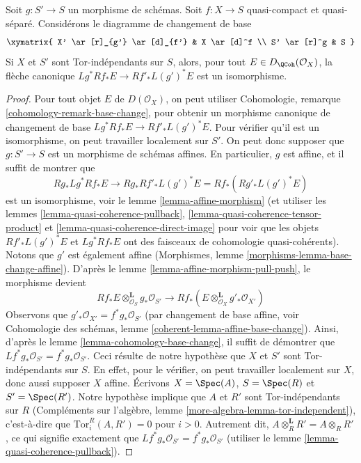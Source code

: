 \begin{lemma}
\label{lemma-compare-base-change}
Soit $g : S' \to S$ un morphisme de schémas.
Soit $f : X \to S$ quasi-compact et quasi-séparé.
Considérons le diagramme de changement de base
$$
\xymatrix{
X' \ar[r]_{g'} \ar[d]_{f'} &
X \ar[d]^f \\
S' \ar[r]^g &
S
}
$$
Si $X$ et $S'$ sont Tor-indépendants sur $S$, alors, pour tout
$E \in D_\QCoh(\mathcal{O}_X)$, la flèche canonique
$Lg^*Rf_*E \to Rf'_*L(g')^*E$ est un isomorphisme.
\end{lemma}

\begin{proof}
Pour tout objet $E$ de $D(\mathcal{O}_X)$, on peut utiliser
Cohomologie, remarque \ref{cohomology-remark-base-change}, pour obtenir un morphisme
canonique de changement de base $Lg^*Rf_*E \to Rf'_*L(g')^*E$. Pour vérifier qu'il
est un isomorphisme, on peut travailler localement sur $S'$. On peut donc supposer que
$g : S' \to S$ est un morphisme de schémas affines. En particulier, $g$
est affine, et il suffit de montrer que
$$
Rg_*Lg^*Rf_*E \to Rg_*Rf'_*L(g')^*E = Rf_*(Rg'_* L(g')^* E)
$$
est un isomorphisme, voir le lemme \ref{lemma-affine-morphism}
(et utiliser les lemmes \ref{lemma-quasi-coherence-pullback},
\ref{lemma-quasi-coherence-tensor-product} et
\ref{lemma-quasi-coherence-direct-image}
pour voir que les objets $Rf'_*L(g')^*E$ et $Lg^*Rf_*E$
ont des faisceaux de cohomologie quasi-cohérents). Notons que $g'$ est
également affine (Morphismes, lemme \ref{morphisms-lemma-base-change-affine}).
D'après le lemme \ref{lemma-affine-morphism-pull-push}, le morphisme devient
$$
Rf_*E \otimes_{\mathcal{O}_S}^\mathbf{L} g_*\mathcal{O}_{S'}
\longrightarrow
Rf_*(E \otimes_{\mathcal{O}_X}^\mathbf{L} g'_*\mathcal{O}_{X'})
$$
Observons que $g'_*\mathcal{O}_{X'} = f^*g_*\mathcal{O}_{S'}$ (par changement
de base affine, voir Cohomologie des schémas, lemme
\ref{coherent-lemma-affine-base-change}).
Ainsi, d'après le
lemme \ref{lemma-cohomology-base-change}, il suffit de démontrer que
$Lf^*g_*\mathcal{O}_{S'} = f^*g_*\mathcal{O}_{S'}$. Ceci résulte de notre
hypothèse que $X$ et $S'$ sont Tor-indépendants sur $S$. En effet, pour
le vérifier, on peut travailler localement sur $X$, donc aussi supposer $X$ affine.
Écrivons $X = \Spec(A)$, $S = \Spec(R)$ et $S' = \Spec(R')$. Notre hypothèse
implique que $A$ et $R'$ sont Tor-indépendants sur $R$
(Compléments sur l'algèbre, lemme \ref{more-algebra-lemma-tor-independent}), c'est-à-dire que
$\text{Tor}_i^R(A, R') = 0$ pour $i > 0$. Autrement dit,
$A \otimes_R^\mathbf{L} R' = A \otimes_R R'$, ce qui signifie exactement
que $Lf^*g_*\mathcal{O}_{S'} = f^*g_*\mathcal{O}_{S'}$
(utiliser le lemme \ref{lemma-quasi-coherence-pullback}).
\end{proof}

